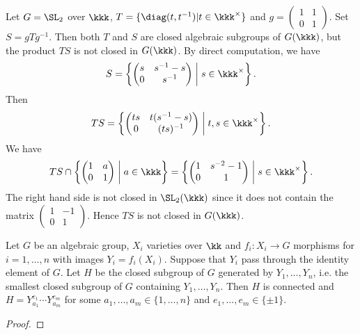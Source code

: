     \begin{example}\label{eg:product_of_closed_algebraic_subgroups_which_is_not_closed}
        Let \(G = \SL_2\) over \(\kkk\), \(T = \{\diag(t,t^{-1})|t \in \kkk^\times\}\) and \(g = \begin{pmatrix}
            1 & 1 \\
            0 & 1
        \end{pmatrix}\).
        Set \(S = gTg^{-1}\).
        Then both \(T\) and \(S\) are closed algebraic subgroups of \(G(\kkk)\), but the product \(TS\) is not closed in \(G(\kkk)\).
        By direct computation, we have
        \[ S = \left\{ \begin{pmatrix}
            s & s^{-1}-s \\
            0 & s^{-1}
        \end{pmatrix} \;\middle|\; s \in \kkk^\times \right\}.
        \]
        Then 
        \[ TS = \left\{ \begin{pmatrix}
            ts & t(s^{-1}-s) \\
            0 & (ts)^{-1}
        \end{pmatrix} \;\middle|\; t,s \in \kkk^\times \right\}.
        \]
        We have 
        \[ TS \cap \left\{ \begin{pmatrix}
            1 & a \\
            0 & 1
        \end{pmatrix} \;\middle|\; a \in \kkk \right\} = \left\{ \begin{pmatrix}
            1 & s^{-2}-1 \\
            0 & 1
        \end{pmatrix} \;\middle|\; s \in \kkk^\times \right\}. \]
        The right hand side is not closed in \(\SL_2(\kkk)\) since it does not contain the matrix \(\begin{pmatrix}
            1 & -1 \\
            0 & 1
        \end{pmatrix}\).
        Hence \(TS\) is not closed in \(G(\kkk)\).
    \end{example}

    \begin{proposition}\label{prop:generate_subgroup_by_irred_constructible_subset}
        Let \(G\) be an algebraic group, \(X_i\) varieties over \(\kk\) and \(f_i: X_i \to G\) morphisms for \(i=1,\ldots,n\) with images \(Y_i = f_i(X_i)\).
        Suppose that \(Y_i\) pass through the identity element of \(G\).
        Let \(H\) be the closed subgroup of \(G\) generated by \(Y_1,\ldots,Y_n\), i.e. the smallest closed subgroup of \(G\) containing \(Y_1,\ldots,Y_n\).
        Then \(H\) is connected and \(H = Y_{a_1}^{e_1} \cdots Y_{a_m}^{e_m}\) for some \(a_1,\ldots,a_m \in \{1,\ldots,n\}\) and \(e_1,\ldots,e_m \in \{\pm 1\}\).
    \end{proposition}
    \begin{proof}
    \end{proof}

